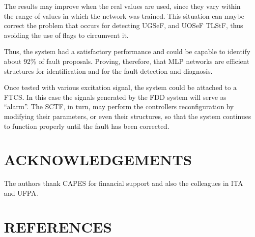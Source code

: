 \documentclass[10pt,fleqn,a4paper]{article}
\begin{document}
The results may improve when the real values are used, since they vary within
the range of values in which the network was trained. This situation can maybe
correct the problem that occurs for detecting UGSeF, and UOSeF TLStF, thus
avoiding the use of flags to circumvent it.

Thus, the system had a satisfactory performance and could be capable to identify
about 92\% of fault proposals. Proving, therefore, that MLP networks are
efficient structures for identification and for the fault detection and
diagnosis.

Once tested with various excitation signal, the system could be attached to a
FTCS. In this case the signals generated by the FDD system will serve as
``alarm''. The SCTF, in turn, may perform the controllers reconfiguration by
modifying their parameters, or even their structures, so that the system
continues to function properly until the fault has been corrected.

\section{ACKNOWLEDGEMENTS}
The authors thank CAPES for financial support and also the colleagues in ITA and
UFPA.

\section{REFERENCES}


\renewcommand{\refname}{}

\end{document}
